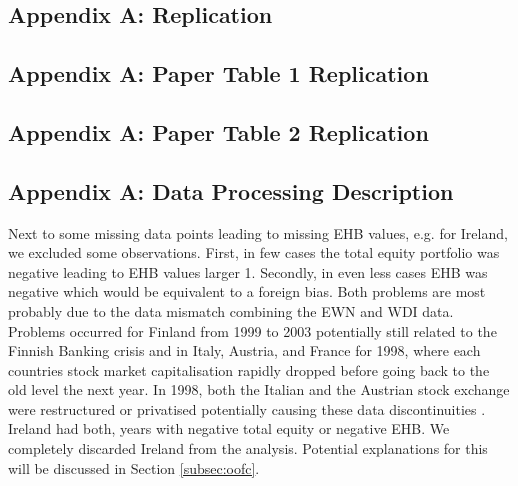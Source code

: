 \documentclass[11pt,a4paper]{article}
\begin{document}
\newpage
\printbibliography
\newpage
\begin{appendices}
\setcounter{table}{0}
\renewcommand{\thetable}{\thesection.\arabic{table}}

\section{Appendix A: Replication}\label{app:replication}

\subsection{Appendix A: Paper Table 1 Replication}\label{app:sec:table_1}

\label{tab:table_1_reg}

\FloatBarrier   

\subsection{Appendix A: Paper Table 2 Replication}\label{app:sec:table_2}

\label{tab:table_2_reg}

\FloatBarrier   

\subsection{Appendix A: Data Processing Description}\label{app:sec:data_proc}

Next to some missing data points leading to missing EHB values, e.g. for Ireland, we excluded some observations. First, in few cases the total equity portfolio was negative leading to EHB values larger 1. 
Secondly, in even less cases EHB was negative which would be equivalent to a foreign bias. Both problems are most probably due to the data mismatch combining the EWN and WDI data. 
Problems occurred for Finland from 1999 to 2003 potentially still related to the Finnish Banking crisis \parencite{HonkapohjaKoskela1999} and in Italy, Austria, and France for 1998, where each countries stock market capitalisation rapidly dropped 
before going back to the old level the next year. In 1998, both the Italian and the Austrian stock exchange were restructured or privatised potentially causing these data discontinuities \parencite{WienerBoerse2026, BorsaItaliana2026}. Ireland had both, years with negative total equity or negative EHB. 
We completely discarded Ireland from the analysis. Potential explanations for this will be discussed in Section \ref{subsec:oofc}. 


\end{appendices}
\end{document}
